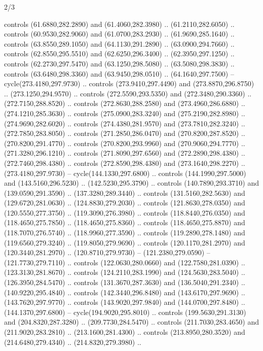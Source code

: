 \begin{flagdescription}{2/3}
\begin{scope}[xshift=0.5\flaglength,yshift=0.5\flagwidth,scale=\stretchfactor]
\begin{scope}[scale=0.001645\flagwidth,yshift=65mm,xshift=-63mm]
\begin{scope}[y=0.80pt, x=0.80pt, yscale=-1,]
\begin{scope}[cm={{1.33333,0.0,0.0,1.33333,(0.0,1e-05)}}]
  controls (61.6880,282.2890) and (61.4060,282.3980) .. (61.2110,282.6050) ..
  controls (60.9530,282.9060) and (61.0700,283.2930) .. (61.9690,285.1640) ..
  controls (63.8550,289.1050) and (64.1130,291.2890) .. (63.0900,294.7660) ..
  controls (62.8550,295.5510) and (62.6250,296.3400) .. (62.3950,297.1250) ..
  controls (62.2730,297.5470) and (63.1250,298.5080) .. (63.5080,298.3830) ..
  controls (63.6480,298.3360) and (63.9450,298.0510) .. (64.1640,297.7500) --
  cycle(273.4180,297.9730) .. controls (273.9410,297.4490) and
  (273.8870,296.8750) .. (273.1250,294.9570) .. controls (272.5590,293.5350) and
  (272.3480,290.3360) .. (272.7150,288.8520) .. controls (272.8630,288.2580) and
  (273.4960,286.6880) .. (274.1210,285.3630) .. controls (275.0900,283.3240) and
  (275.2190,282.8980) .. (274.9690,282.6020) .. controls (274.4380,281.9570) and
  (273.7810,282.3240) .. (272.7850,283.8050) .. controls (271.2850,286.0470) and
  (270.8200,287.8520) .. (270.8200,291.4770) .. controls (270.8200,293.9960) and
  (270.9060,294.7770) .. (271.3280,296.1210) .. controls (271.8090,297.6560) and
  (272.2890,298.4380) .. (272.7460,298.4380) .. controls (272.8590,298.4380) and
  (273.1640,298.2270) .. (273.4180,297.9730) -- cycle(144.1330,297.6800) ..
  controls (144.1990,297.5000) and (143.5160,296.5230) .. (142.5230,295.3790) ..
  controls (140.7890,293.3710) and (139.0590,291.3590) .. (137.3280,289.3440) ..
  controls (131.5160,282.5630) and (129.6720,281.0630) .. (124.8830,279.2030) ..
  controls (121.8630,278.0350) and (120.5550,277.3750) .. (119.3090,276.3980) ..
  controls (118.8440,276.0350) and (118.4650,275.7850) .. (118.4650,275.8360) ..
  controls (118.4650,275.8870) and (118.7070,276.5740) .. (118.9960,277.3590) ..
  controls (119.2890,278.1480) and (119.6560,279.3240) .. (119.8050,279.9690) ..
  controls (120.1170,281.2970) and (120.3440,281.2970) .. (120.8710,279.9730) --
  (121.2380,279.0590) -- (121.7730,279.7110) .. controls (122.0630,280.0660) and
  (122.7580,281.0390) .. (123.3130,281.8670) .. controls (124.2110,283.1990) and
  (124.5630,283.5040) .. (126.3950,284.5470) .. controls (131.3670,287.3630) and
  (136.5040,291.2340) .. (140.9220,295.4840) .. controls (142.3440,296.8480) and
  (143.6170,297.9690) .. (143.7620,297.9770) .. controls (143.9020,297.9840) and
  (144.0700,297.8480) .. (144.1370,297.6800) -- cycle(194.9020,295.8010) ..
  controls (199.5630,291.3130) and (204.8320,287.3280) .. (209.7730,284.5470) ..
  controls (211.7030,283.4650) and (211.9020,283.2810) .. (213.1600,281.4300) ..
  controls (213.8950,280.3520) and (214.6480,279.4340) .. (214.8320,279.3980) ..

\end{scope}
\end{scope}
\end{scope}
\end{scope}
\end{flagdescription}
